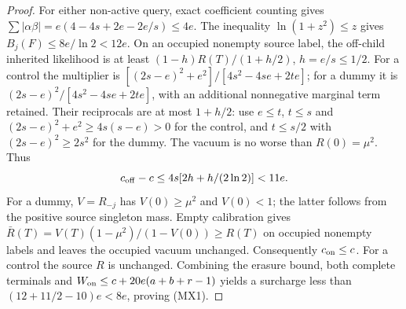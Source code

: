 \begin{proof}
For either non-active query, exact coefficient counting gives
$\sum|\alpha\beta|=e(4-4s+2e-2e/s)\le4e$.
The inequality $\ln(1+z^2)\le z$ gives
$B_j(F)\le8e/\ln2<12e$. On an occupied nonempty source
label, the off-child inherited likelihood is at least
$(1-h)R(T)/(1+h/2)$, $h=e/s\le1/2$.
For a control the multiplier is
$[(2s-e)^2+e^2]/[4s^2-4se+2te]$; for a dummy it is
$(2s-e)^2/[4s^2-4se+2te]$, with an additional nonnegative
marginal term retained. Their reciprocals are at most $1+h/2$:
use $e\le t$, $t\le s$ and
$(2s-e)^2+e^2\ge4s(s-e)>0$ for the control, and
$t\le s/2$ with $(2s-e)^2\ge2s^2$ for the dummy.
The vacuum is no worse than $R(0)=\mu^2$. Thus
\[
 c_{\rm off}-c\le4s[2h+h/(2\ln2)]<11e.
\]
For a dummy, $V=R_{-j}$ has $V(0)\ge\mu^2$ and $V(0)<1$;
the latter follows from the positive source singleton mass.
Empty calibration gives
$\bar R(T)=V(T)(1-\mu^2)/(1-V(0))\ge R(T)$ on occupied
nonempty labels and leaves the occupied vacuum unchanged.
Consequently $c_{\rm on}\le c$. For a control the source $R$
is unchanged. Combining the erasure bound, both complete
terminals and $W_{\rm on}\le c+20e(a+b+r-1)$ yields a surcharge
less than $(12+11/2-10)e<8e$, proving (MX1).
\end{proof}

